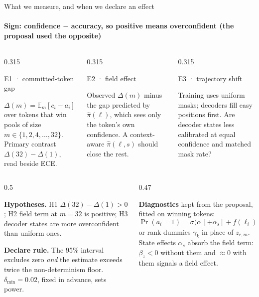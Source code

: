 \documentclass[aspectratio=169,10pt,t]{beamer}
\newcommand{\lbl}[1]{{\color{accentdark}\firasemibold #1}}
\newcommand{\paneltitle}[1]{{\color{accentdark}\small\firasemibold #1}\par\vspace{0.8mm}}
\begin{document}
\begin{frame}{What we measure, and when we declare an effect}
  \framesubtitle{Sign: confidence $-$ accuracy, so positive means overconfident (the proposal used the opposite)}
  \vspace{1.5mm}
  \begin{columns}[T,onlytextwidth]
    \begin{column}{0.315\textwidth}
      \begin{panel}[height=25mm]
        \paneltitle{E1 · committed-token gap}
        $\Delta(m) = \mathbb{E}_m[c_i - a_i]$ over tokens that win pools of size
        $m \in \{1, 2, 4, \dots, 32\}$. Primary contrast $\Delta(32) - \Delta(1)$, read
        beside ECE.
      \end{panel}
    \end{column}
    \begin{column}{0.315\textwidth}
      \begin{panel}[height=25mm]
        \paneltitle{E2 · field effect}
        Observed $\Delta(m)$ minus the gap predicted by $\hat\pi(\ell)$, which sees only the
        token's own confidence. A context-aware $\hat\pi(\ell, s)$ should close the rest.
      \end{panel}
    \end{column}
    \begin{column}{0.315\textwidth}
      \begin{panel}[height=25mm]
        \paneltitle{E3 · trajectory shift}
        Training uses uniform masks; decoders fill easy positions first. Are decoder states
        less calibrated at equal confidence and matched mask rate?
      \end{panel}
    \end{column}
  \end{columns}
  \vspace{2.5mm}
  \begin{columns}[T,onlytextwidth]
    \begin{column}{0.5\textwidth}
      \small\raggedright
      \textbf{Hypotheses.} \lbl{H1} $\Delta(32) - \Delta(1) > 0$;
      \lbl{H2} field term at $m = 32$ is positive;
      \lbl{H3} decoder states are more overconfident than uniform ones.\par\vspace{1.5mm}
      \textbf{Declare rule.} The 95\% interval excludes zero \emph{and} the estimate exceeds
      twice the non-determinism floor. $\delta_{\min} = 0.02$, fixed in advance, sets power.
    \end{column}
    \begin{column}{0.47\textwidth}
      \small\raggedright
      \textbf{Diagnostics} kept from the proposal, fitted on winning tokens:
      \[
        \Pr(a_i{=}1) = \sigma\big(\alpha\,[+\alpha_s] + f(\ell_i) + \beta_z z_{r,m}\big),
      \]
      or rank dummies $\gamma_k$ in place of $z_{r,m}$. State effects $\alpha_s$ absorb the
      field term: $\beta_z < 0$ without them and $\approx 0$ with them signals a field effect.
    \end{column}
  \end{columns}
\end{frame}
\end{document}
